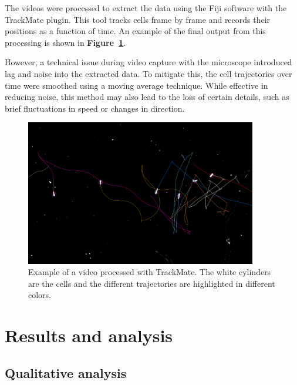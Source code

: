 \begin{minipage}{0.49\textwidth}
The videos were processed to extract the data using the Fiji software with the TrackMate plugin. This tool tracks cells frame by frame and records their positions as a function of time. An example of the final output from this processing is shown in \textbf{Figure~\ref{fig:trackmate}}.

However, a technical issue during video capture with the microscope introduced lag and noise into the extracted data. To mitigate this, the cell trajectories over time were smoothed using a moving average technique. While effective in reducing noise, this method may also lead to the loss of certain details, such as brief fluctuations in speed or changes in direction.
\end{minipage}
\hfill
\begin{minipage}{0.47\textwidth}
\begin{figure}[H]
\centering 
\captionsetup{width=1\linewidth, justification=centering}
\includegraphics[width=0.9\textwidth]{Figures/Fiji.png}
\caption{Example of a video processed with TrackMate. The white cylinders are the cells and the different trajectories are highlighted in different colors.}
\label{fig:trackmate}
\end{figure}
\end{minipage}


\section{Results and analysis}

\subsection{Qualitative analysis}

